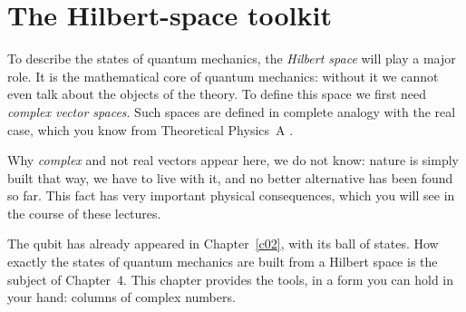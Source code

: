 %

\chapter{The Hilbert-space toolkit}\label{c03}

To describe the states of quantum mechanics, the \emph{Hilbert space} will play a major role.
It is the mathematical core of quantum mechanics: without it we cannot even talk about the
objects of the theory. To define this space we first need \emph{complex vector spaces}. Such
spaces are defined in complete analogy with the real case, which you know from Theoretical
Physics~A .

Why \emph{complex} and not real vectors appear here, we do not know: nature is simply built
that way, we have to live with it, and no better alternative has been found so far. This fact
has very important physical consequences, which you will see in the course of these lectures.

The qubit has already appeared in Chapter~\ref{c02}, with its ball of states. How exactly the
states of quantum mechanics are built from a Hilbert space is the subject of Chapter~4. This
chapter provides the tools, in a form you can hold in your hand: columns of complex numbers.

